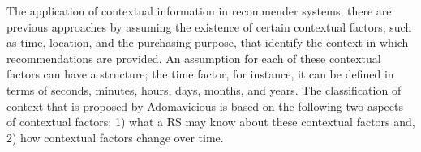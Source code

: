 The application of contextual information in recommender systems, there are %
previous approaches by assuming the existence of certain contextual         %
factors, such as time, location, and the purchasing purpose, that
identify the context in which recommendations are provided. An
assumption for each of these contextual factors can have a structure;
the time factor, for instance, it can be defined in terms of seconds,
minutes, hours, days, months, and years. The classification of context 
that is proposed by Adomavicious\cite{adomavicius2011context} is based on the 
following two aspects of contextual factors: 1) what a RS may know
about these contextual factors and, 2) how contextual factors change
over time.
\begin{enumerate}


\end{enumerate}
